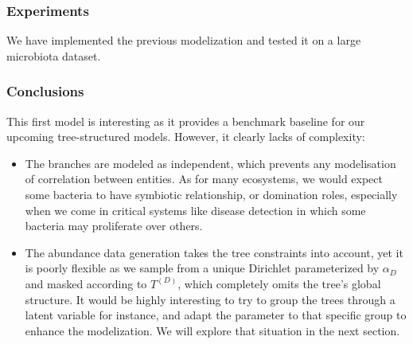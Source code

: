 
\subsubsection{Experiments}

We have implemented the previous modelization and tested it on a large microbiota dataset.

\subsubsection{Conclusions}

This first model is interesting as it provides a benchmark baseline for our upcoming tree-structured models.
However, it clearly lacks of complexity:
\begin{itemize}
    \item The branches are modeled as independent, which prevents any modelisation of correlation between entities.
          As for many ecosystems, we would expect some bacteria to have symbiotic relationship, or domination roles,
          especially when we come in critical systems like disease detection in which some bacteria may proliferate over others.
    \item The abundance data generation takes the tree constraints into account, yet it is poorly flexible as we sample from a unique Dirichlet
          parameterized by $\alpha_D$ and masked according to $T^{(D)}$, which completely omits the tree's global structure.
          It would be highly interesting to try to group the trees through a latent variable for instance, and adapt the parameter
          to that specific group to enhance the modelization.
          We will explore that situation in the next section.
\end{itemize}